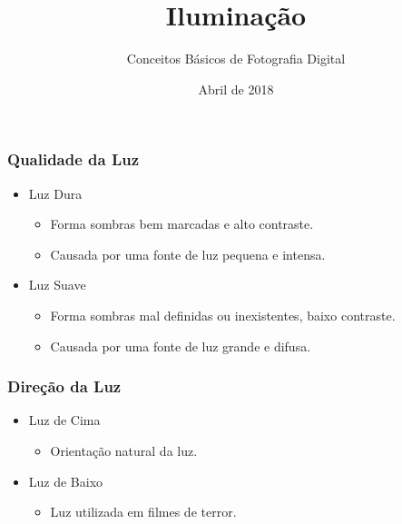 


\title{Iluminação}
\subtitle{Conceitos Básicos de Fotografia Digital}
\author{}
\date{Abril de 2018}



\coverframe

\begin{frame}
  \frametitle{Qualidade da Luz}
  \begin{itemize}
      \item Luz Dura
      \begin{itemize}
          \item Forma sombras bem marcadas e alto contraste.
          \item Causada por uma fonte de luz pequena e intensa.
      \end{itemize}

      \item Luz Suave
      \begin{itemize}
          \item Forma sombras mal definidas ou inexistentes, baixo contraste.
          \item Causada por uma fonte de luz grande e difusa.
      \end{itemize}
  \end{itemize}
\end{frame}




\begin{frame}
  \frametitle{Direção da Luz}
  \begin{itemize}
      \item Luz de Cima
      \begin{itemize}
          \item Orientação natural da luz.
      \end{itemize}
      \item Luz de Baixo
      \begin{itemize}
          \item Luz utilizada em filmes de terror.
      \end{itemize}
  \end{itemize}
\end{frame}

